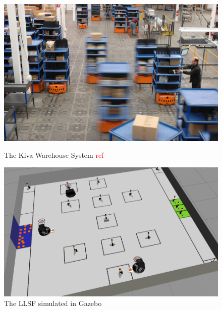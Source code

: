 \begin{figure}
\begin{minipage}[b]{0.5\linewidth}
\includegraphics[width=\textwidth,height=0.65\textwidth]{pics/kiva}
\caption{The Kiva Warehouse System \textcolor{red}{ref}}
\label{fig:kiva}
\end{minipage}
\quad
\begin{minipage}[b]{0.5\linewidth}
\includegraphics[width=\textwidth,height=0.65\textwidth]{pics/sim_working}
\caption{The LLSF simulated in Gazebo}
\label{fig:intro_sim}
\end{minipage}
\end{figure}
